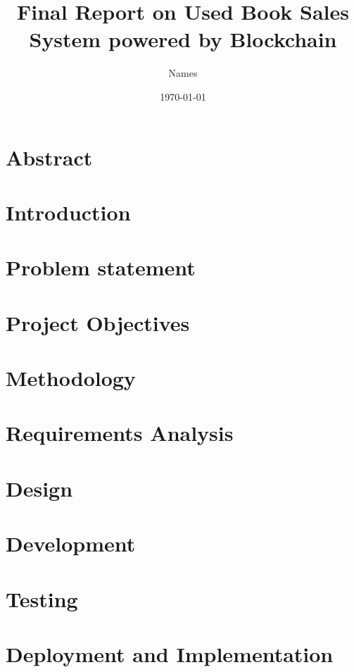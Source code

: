 \documentclass{article}
\title{Final Report on Used Book Sales System powered by Blockchain}
\author{ Names}
\date{\today}
\begin{document}
\maketitle

\section{Abstract}

\section{Introduction}

\section{Problem statement}

\section{Project Objectives}

\section{Methodology}

\section{Requirements Analysis}

\section{Design}

\section{Development}

\section{Testing}

\section{Deployment and Implementation}
\end{document}
